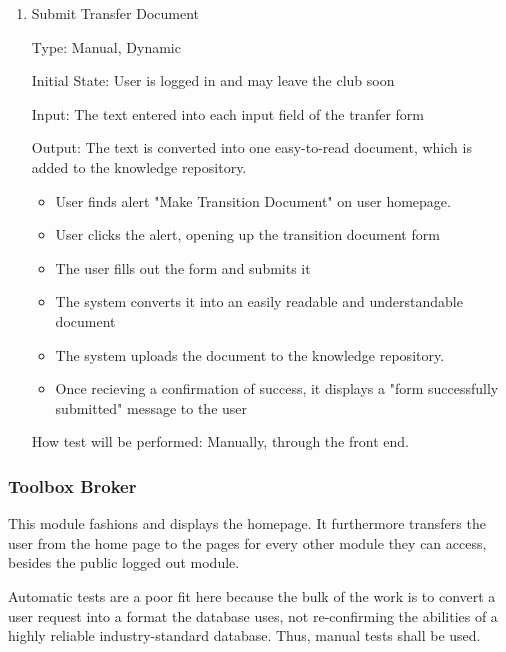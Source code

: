 \documentclass[12pt, titlepage]{article}
\begin{document}
\begin{enumerate}

\item{Submit Transfer Document\\}

Type: Manual, Dynamic
					
Initial State: User is logged in and may leave the club soon
					
Input: The text entered into each input field of the tranfer form 
					
Output: The text is converted into one easy-to-read document, which is added to the knowledge repository.

\begin{itemize}
  \item User finds alert "Make Transition Document" on user homepage.
  \item User clicks the alert, opening up the transition document form
  \item The user fills out the form and submits it
  \item The system converts it into an easily readable and understandable document
  \item The system uploads the document to the knowledge repository.
  \item Once recieving a confirmation of success, it displays a "form successfully submitted" message to the user
\end{itemize}

How test will be performed: Manually, through the front end. 
    
\end{enumerate}

\subsubsection{Toolbox Broker}

This module fashions and displays the homepage. It furthermore transfers the user from the home page to the pages
for every other module they can access, besides the public logged out module.

Automatic tests are a poor fit here because the bulk of the work is to convert a user request into a format the 
database uses, not re-confirming the abilities of a highly reliable industry-standard database. Thus, manual
tests shall be used.
\end{document}

